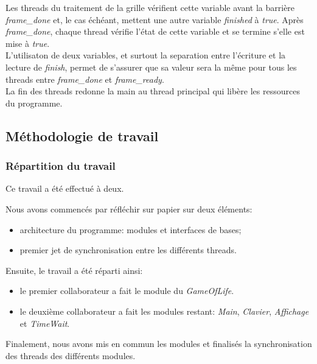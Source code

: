 \documentclass[11pt, a4paper]{article}
\begin{document}
Les threads du traitement de la grille vérifient cette variable avant la barrière \textit{frame\_done} et, le cas échéant, mettent une autre variable \textit{finished} à \textit{true}. Après \textit{frame\_done}, chaque thread vérifie l'état de cette variable et se termine s'elle est mise à \textit{true}. \\

L'utilisaton de deux variables, et surtout la separation entre l'écriture et la lecture de \textit{finish}, permet de s'assurer que sa valeur sera la même pour tous les threads entre \textit{frame\_done} et \textit{frame\_ready}. \\

La fin des threads redonne la main au thread principal qui libère les ressources du programme.

\newpage

\subsection{Méthodologie de travail}
\subsubsection{Répartition du travail}

Ce travail a été effectué à deux.

Nous avons commencés par réfléchir sur papier sur deux éléments:

\begin{itemize}
    \item architecture du programme: modules et interfaces de bases;
    \item premier jet de synchronisation entre les différents threads. \\
\end{itemize}

Ensuite, le travail a été réparti ainsi:
\begin{itemize}
    \item le premier collaborateur a fait le module du \textit{GameOfLife}.
    \item le deuxième collaborateur a fait les modules restant: \textit{Main}, \textit{Clavier}, \textit{Affichage} et \textit{TimeWait}. \\
\end{itemize}

Finalement, nous avons mis en commun les modules et finalisés la synchronisation des threads des différents modules.

\newpage
\end{document}
